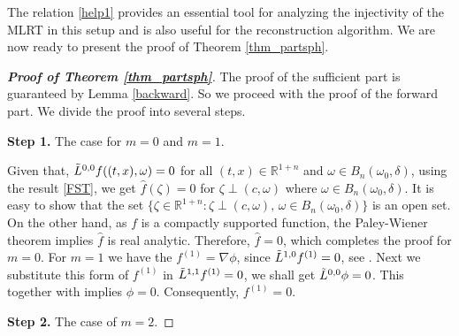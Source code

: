 \documentclass[11pt,a4paper,reqno]{amsart}
\newcommand{\R}{\mathbb{R}}
\newcommand{\om}{\omega}
\begin{document}
    The relation \eqref{help1} provides an essential tool for analyzing the injectivity of the MLRT in this setup and is also useful for the reconstruction algorithm. We are now ready to present the proof of Theorem \ref{thm_partsph}. 
	\begin{proof}[\textbf{Proof of Theorem \ref{thm_partsph}}]
		The proof of the sufficient part is guaranteed by Lemma \ref{backward}. So we proceed with the proof of the forward part. We divide the proof into several steps.\smallskip
		
		\textbf{Step 1.} The case for $m=0$ and $m=1$.
	
		Given that, $\Tilde{L}^{0,0}f((t,x),\omega)=0$ for all $(t,x)\in \mathbb{R}^{1+n}$ and $\omega \in B_{n}(\omega_0, \delta)$, using the result \ref{FST}, we get $\hat{f}(\zeta)=0$ for $\zeta \perp (c,\omega)$ where $\omega \in B_{n}(\omega_0, \delta)$. It is easy to show that the set $\{\zeta \in \R^{1+n} : \zeta \perp (c,\om),\, \om \in B_n(\om_0,\delta)\}$ is an open set. On the other hand, as $f$ is a compactly supported function, the Paley-Wiener theorem implies $\hat{f}$ is real analytic. Therefore, $\hat{f}=0$, which completes the proof for $m=0$. For $m=1$ we have the $f^{(1)}= \nabla \phi$, since $ \Tilde{L}^{1,0}f^{(1)}=0$, see \cite{krishnan2020inverse}. Next we substitute this form of $f^{(1)}$ in $\Tilde{L}^{1,1}f^{(1)}=0$, we shall get $\Tilde{L}^{0,0}\phi=0$. This together with \cite[Proposition 2.2]{ramm1991inverse} implies $\phi=0$. Consequently, $f^{(1)}=0$. \smallskip
		
		\textbf{Step 2.} The case of $m=2$.
		

\end{proof}
\end{document}
